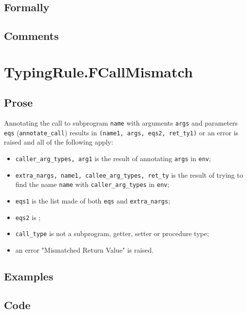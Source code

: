 \documentclass{book}
\begin{document}
  \subsection{Formally}

  \subsection{Comments}


\section{TypingRule.FCallMismatch \label{sec:TypingRule.FCallMismatch}}

  \subsection{Prose}
  Annotating the call to subprogram \texttt{name} with arguments \texttt{args}
and parameters \texttt{eqs} (\texttt{annotate\_call}) results in
\texttt{(name1, args, eqs2, ret\_ty1)} or an error is raised and all of the following apply:
   \begin{itemize}
   \item \texttt{caller\_arg\_types, arg1} is the result of annotating \texttt{args} in \texttt{env};
   \item \texttt{extra\_nargs, name1, callee\_arg\_types, ret\_ty} is the result of trying to
      find the name \texttt{name} with \texttt{caller\_arg\_types} in \texttt{env};
   \item \texttt{eqs1} is the list made of both \texttt{eqs} and \texttt{extra\_nargs};
   \item \texttt{eqs2} is ;
   \item \texttt{call\_type} is not a subprogram, getter, setter or procedure type;
   \item an error "Mismatched Return Value" is raised.
   \end{itemize}

  \subsection{Examples}

  \subsection{Code}
\end{document}
